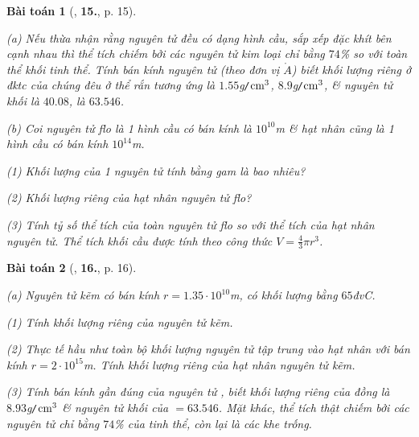 \documentclass{article}
\numberwithin{equation}{section}
\newtheorem{baitoan}{Bài toán}[section]
\begin{document}
\begin{baitoan}[\cite{An2012}, \textbf{15.}, p. 15]
	\begin{enumerate*}
		\item[(a)] Nếu thừa nhận rằng nguyên tử \emph{} đều có dạng hình cầu, sắp xếp đặc khít bên cạnh nhau thì thể tích chiếm bởi các nguyên tử kim loại chỉ bằng $74$\% so với toàn thể khối tinh thể. Tính bán kính nguyên tử \emph{} (theo đơn vị $\mathring{A}$) biết khối lượng riêng ở đktc của chúng đêu ở thể rắn tương ứng là $1.55$\emph{g\texttt{/}$\rm cm^3$}, $8.9$\emph{g\texttt{/}$\rm cm^3$}, \& nguyên tử khối \emph{} là $40.08$, \emph{} là $63.546$.
		\item[(b)] Coi nguyên tử flo \emph{} là 1 hình cầu có bán kính là $10^{10}$\emph{m} \& hạt nhân cũng là 1 hình cầu có bán kính $10^{14}$\emph{m}.
		\begin{enumerate*}
			\item[(1)] Khối lượng của 1 nguyên tử \emph{} tính bằng gam là bao nhiêu?
			\item[(2)] Khối lượng riêng của hạt nhân nguyên tử flo?
			\item[(3)] Tính tỷ số thể tích của toàn nguyên tử flo so với thể tích của hạt nhân nguyên tử. Thể tích khối cầu được tính theo công thức $V = \frac{4}{3}\pi r^3$.
		\end{enumerate*}
	\end{enumerate*}
\end{baitoan}

\begin{baitoan}[\cite{An2012}, \textbf{16.}, p. 16]
	\begin{enumerate*}
		\item[(a)] Nguyên tử kẽm có bán kính $r = 1.35\cdot 10^{10}$\emph{m}, có khối lượng bằng $65$\emph{đvC}.
		\begin{enumerate*}
			\item[(1)] Tính khối lượng riêng của nguyên tử kẽm.
			\item[(2)] Thực tế hầu như toàn bộ khối lượng nguyên tử tập trung vào hạt nhân với bán kính $r = 2\cdot 10^{15}$\emph{m}. Tính khối lượng riêng của hạt nhân nguyên tử kẽm.
			\item[(3)] Tính bán kính gần đúng của nguyên tử \emph{}, biết khối lượng riêng của đồng là $8.93$\emph{g\texttt{/}$\rm cm^3$} \& nguyên tử khối của \emph{} $= 63.546$. Mặt khác, thể tích thật chiếm bởi các nguyên tử chỉ bằng $74$\% của tinh thể, còn lại là các khe trống.
		\end{enumerate*}
	\end{enumerate*}
\end{baitoan}
\end{document}
